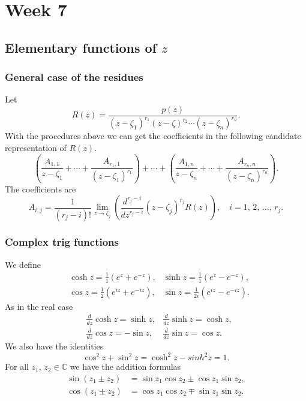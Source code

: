 \documentclass{article}
\begin{document}
\section{Week 7}
\subsection{Elementary functions of $z$}
\subsubsection{General case of the residues}
Let 
\begin{equation}
    R(z) = \frac{p(z)}{(z-\zeta_1)^{r_1}(z-\zeta)^{r_2}\cdots(z-\zeta_n)^{r_n}}.
\end{equation}
With the procedures above we can get the coefficients in the following candidate representation of $R(z)$.
\begin{equation}
    \left( \frac{A_{1,1}}{z-\zeta_1} + \cdots + \frac{A_{r_1,1}}{(z-\zeta_1)^{r_1}} \right) + \cdots + \left( \frac{A_{1,n}}{z-\zeta_n} + \cdots + \frac{A_{r_n,n}}{(z-\zeta_n)^{r_n}} \right).
\end{equation}
The coefficients are 
\begin{equation}
    A_{i,j} = \frac{1}{(r_j-i)!}\lim_{z\to\zeta_j}\left( \frac{d^{r_j -i}}{dz^{r_j -i}}(z-\zeta_j)^{r_j}R(z) \right),\quad i=1,\,2,\,\ldots,\,r_j.
\end{equation}
\subsubsection{Complex trig functions}
We define
\begin{align}
    &\cosh{z} = \frac{1}{1}(e^z+e^{-z}), &\sinh{z} = \frac{1}{1}(e^z - e^{-z}), \nonumber\\
    &\cos{z} = \frac{1}{2}(e^{iz} + e^{-iz}), &\sin{z} = \frac{1}{2i}(e^{iz}-e^{-iz}). \nonumber
\end{align}
As in the real case
\begin{align}
    &\frac{d}{dz}\cosh{z} = \sinh{z}, &\frac{d}{dz}\sinh{z}=\cosh{z}, \nonumber \\
    &\frac{d}{dz}\cos{z} = -\sin{z}, &\frac{d}{dz}\sin{z}=\cos{z}. \nonumber
\end{align}
We also have the identities
\begin{equation}
    \cos^2 z + \sin^2 z = \cosh^2 z - sinh^2 z = 1.
\end{equation}
For all $z_1,\,z_2\in\mathbb{C}$ we have the addition formulas
\begin{align}
    \sin{(z_1\pm z_2)} &= \sin{z_1}\cos{z_2}\pm\cos{z_1}\sin{z_2}, \\
    \cos{(z_1\pm z_2)} &= \cos{z_1}\cos{z_2}\mp\sin{z_1}\sin{z_2}.
\end{align}
\end{document}
